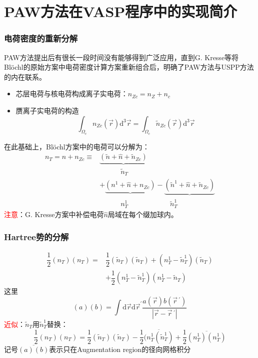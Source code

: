 \documentclass[cjk,slidestop,compress,mathserif,blue]{beamer}
\begin{document}
\section{PAW方法在VASP程序中的实现简介}
\frame
{
\frametitle{电荷密度的重新分解}
\textrm{PAW}方法提出后有很长一段时间没有能够得到广泛应用，直到\textrm{G. Kresse}等将\textrm{Bl\"ochl}的原始方案中电荷密度计算方案重新组合后，明确了\textrm{PAW}方法与\textrm{USPP}方法的内在联系。
\begin{itemize}
	\item 芯层电荷与核电荷构成离子实电荷：$n_{Zc}=n_Z+n_c$
	\item 赝离子实电荷的构造$$\int_{\Omega_c}n_{Zc}(\vec r)\mathrm{d}^3\vec r=\int_{\Omega_c}\tilde n_{Zc}(\vec r)\mathrm{d}^3\vec r$$
\end{itemize}
在此基础上，\textrm{Bl\"ochl}方案中的电荷可以分解为：
\begin{displaymath}
	\begin{aligned}
		n_T=n+n_{Zc}\equiv&\underbrace{(\tilde n+\hat n+\tilde n_{Zc})}\\
				 		&\quad\qquad\tilde n_T\\
				  &+\underbrace{(n^1+\hat n+n_{Zc})}-\underbrace{(\tilde n^1+\hat n+\tilde n_{Zc})}\\
				                  &\quad\qquad n_T^1\qquad\qquad\qquad\tilde n_T^1
	\end{aligned}
\end{displaymath}
\textcolor{red}{注意}：\textrm{G. Kresse}方案中补偿电荷$\hat n$局域在每个缀加球内。
}

\frame
{
\frametitle{Hartree势的分解}
\begin{displaymath}
	\begin{aligned}
		\dfrac12(n_T)(n_T)=&\dfrac12(\tilde n_T)(\tilde n_T)+(n_T^1-\tilde n_T^1)(\tilde n_T)\\
				&+\dfrac12(n_T^1-\tilde n_T^1)(n_T^1-\tilde n_T)
	\end{aligned}
\end{displaymath}
这里$$(a)(b)=\int\mathrm{d}\vec r\mathrm{d}\vec r^{\prime}\dfrac{a(\vec r)b(\vec r\,^{\prime})}{|\vec r-\vec r\,^{\prime}|}$$
\textcolor{red}{近似}：$\tilde n_T$用$\tilde n_T^1$替换：
\begin{displaymath}
	\dfrac12(n_T)(n_T)=\dfrac12(\tilde n_T)(\tilde n_T)-\dfrac12\overline{(n_T^1(\tilde n_T^1)}+\dfrac12\overline{(n_T^1)(n_T^1)}
\end{displaymath}
记号$\overline{(a)(b)}$表示只在\textrm{Augmentation region}的径向网格积分
}
\end{document}
